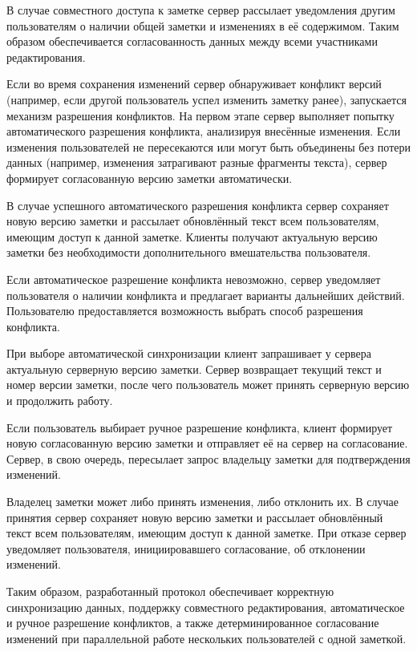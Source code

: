 В случае совместного доступа к заметке сервер рассылает уведомления другим пользователям о наличии общей заметки и изменениях в её содержимом. Таким образом обеспечивается согласованность данных между всеми участниками редактирования.

Если во время сохранения изменений сервер обнаруживает конфликт версий (например, если другой пользователь успел изменить заметку ранее), запускается механизм разрешения конфликтов. На первом этапе сервер выполняет попытку автоматического разрешения конфликта, анализируя внесённые изменения. Если изменения пользователей не пересекаются или могут быть объединены без потери данных (например, изменения затрагивают разные фрагменты текста), сервер формирует согласованную версию заметки автоматически.

В случае успешного автоматического разрешения конфликта сервер сохраняет новую версию заметки и рассылает обновлённый текст всем пользователям, имеющим доступ к данной заметке. Клиенты получают актуальную версию заметки без необходимости дополнительного вмешательства пользователя.

Если автоматическое разрешение конфликта невозможно, сервер уведомляет пользователя о наличии конфликта и предлагает варианты дальнейших действий. Пользователю предоставляется возможность выбрать способ разрешения конфликта.

При выборе автоматической синхронизации клиент запрашивает у сервера актуальную серверную версию заметки. Сервер возвращает текущий текст и номер версии заметки, после чего пользователь может принять серверную версию и продолжить работу.

Если пользователь выбирает ручное разрешение конфликта, клиент формирует новую согласованную версию заметки и отправляет её на сервер на согласование. Сервер, в свою очередь, пересылает запрос владельцу заметки для подтверждения изменений.

Владелец заметки может либо принять изменения, либо отклонить их. В случае принятия сервер сохраняет новую версию заметки и рассылает обновлённый текст всем пользователям, имеющим доступ к данной заметке. При отказе сервер уведомляет пользователя, инициировавшего согласование, об отклонении изменений.

Таким образом, разработанный протокол обеспечивает корректную синхронизацию данных, поддержку совместного редактирования, автоматическое и ручное разрешение конфликтов, а также детерминированное согласование изменений при параллельной работе нескольких пользователей с одной заметкой.

